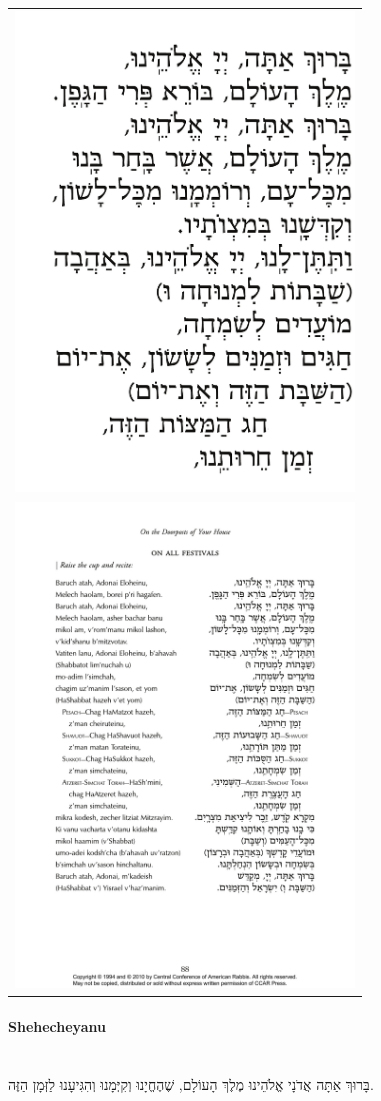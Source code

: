 \documentclass[12pt]{report}
\newenvironment{HgHebrew}{\begin{hebrew}\strut\\\noindent\Large}{\end{hebrew}}
\begin{document}
\newpage
\begin{tabular}{r}
\includegraphics[width=9cm]{figs/0A020-kiddush1}\\
\includegraphics[width=9cm]{figs/0A024-kiddush2}\\
\end{tabular}

\newpage
\paragraph*{Shehecheyanu}

\begin{HgHebrew}
 בָּרוּךְ אַתָּה אֲדֹנָי אֱלֹהֵינוּ מֶלֶךְ הָעוֹלָם,
 שֶׁהֶחֱיָנוּ וְקִיְּמָנוּ וְהִגִּיעָנוּ לַזְּמָן הַזֶּה.
\end{HgHebrew}
\end{document}
